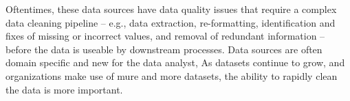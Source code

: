 Oftentimes, these data sources have data quality issues that require a complex data cleaning pipeline -- 
e.g., data extraction, re-formatting, identification and fixes of missing or incorrect values,
and removal of redundant information -- before the data is useable by downstream processes.
Data sources are often domain specific and new for the data analyst, 
As datasets continue to grow, and organizations make use of mure and more datasets, the ability to
rapidly clean the data is more important.  
\fi

